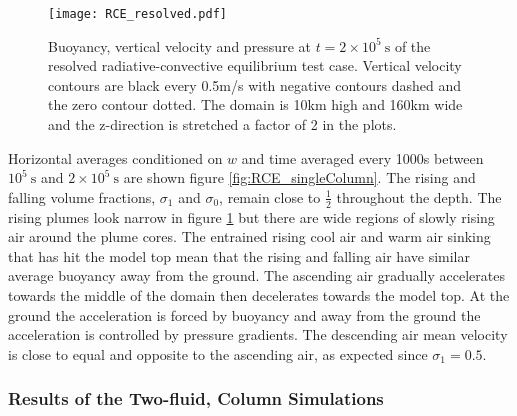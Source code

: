 \documentclass[draft]{agujournal2019}
\begin{document}
\begin{figure}
\noindent 
\texttt{[image: RCE\_resolved.pdf]}
\caption{\label{fig:RCE_resolved}
Buoyancy, vertical velocity and pressure at $t=2\times10^{5}\ \text{s}$
of the resolved radiative-convective equilibrium test case. Vertical
velocity contours are black every 0.5m/s with negative contours dashed
and the zero contour dotted. The domain is 10km high and 160km wide
and the z-direction is stretched a factor of 2 in the plots.}
\end{figure}

Horizontal averages conditioned on $w$ and time averaged every 1000s
between $10^{5}\ \text{s}$ and $2\times10^{5}\ \text{s}$ are shown
 figure \ref{fig:RCE_singleColumn}. The rising and
falling volume fractions, $\sigma_{1}$ and $\sigma_{0}$, remain
close to $\frac{1}{2}$ throughout the depth. The rising plumes look
narrow in figure \ref{fig:RCE_resolved} but there are wide regions
of slowly rising air around the plume cores. The entrained rising
cool air and warm air sinking that has hit the model top mean that
the rising and falling air have similar average buoyancy away from
the ground. The ascending air gradually accelerates towards the middle
of the domain then decelerates towards the model top. At the ground
the acceleration is forced by buoyancy and away from the ground the
acceleration is controlled by pressure gradients. The descending air
mean velocity is close to equal and opposite to the ascending air,
as expected since $\sigma_{1}=0.5$.

\subsubsection{Results of the Two-fluid,  Column Simulations}
\end{document}

